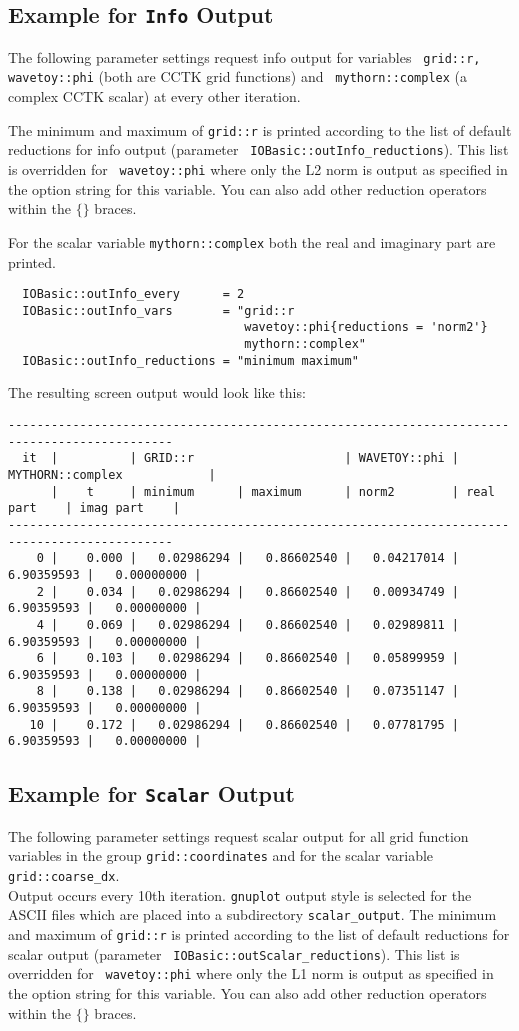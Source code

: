 \documentclass{article}
\begin{document}
\subsection {Example for {\tt Info} Output}
%
The following parameter settings request info output for variables {\tt
grid::r, wavetoy::phi} (both are CCTK grid functions) and {\tt
mythorn::complex}
(a complex CCTK scalar) at every other iteration.

The minimum and maximum of {\tt grid::r} is printed according to the list
of default reductions for info output (parameter {\tt
IOBasic::outInfo\_reductions}). This list is overridden for {\tt
wavetoy::phi} where only the L2 norm
is output as specified in the option string for this variable. You can also
add other reduction operators within the $\{\}$ braces.

For the scalar variable {\tt mythorn::complex} both the real and
imaginary part are printed.
\begin{verbatim}
  IOBasic::outInfo_every      = 2
  IOBasic::outInfo_vars       = "grid::r
                                 wavetoy::phi{reductions = 'norm2'}
                                 mythorn::complex"
  IOBasic::outInfo_reductions = "minimum maximum"
\end{verbatim}
The resulting screen output would look like this:
\begin{verbatim}
---------------------------------------------------------------------------------------------
  it  |          | GRID::r                     | WAVETOY::phi | MYTHORN::complex            |
      |    t     | minimum      | maximum      | norm2        | real part    | imag part    |
---------------------------------------------------------------------------------------------
    0 |    0.000 |   0.02986294 |   0.86602540 |   0.04217014 |   6.90359593 |   0.00000000 |
    2 |    0.034 |   0.02986294 |   0.86602540 |   0.00934749 |   6.90359593 |   0.00000000 |
    4 |    0.069 |   0.02986294 |   0.86602540 |   0.02989811 |   6.90359593 |   0.00000000 |
    6 |    0.103 |   0.02986294 |   0.86602540 |   0.05899959 |   6.90359593 |   0.00000000 |
    8 |    0.138 |   0.02986294 |   0.86602540 |   0.07351147 |   6.90359593 |   0.00000000 |
   10 |    0.172 |   0.02986294 |   0.86602540 |   0.07781795 |   6.90359593 |   0.00000000 |
\end{verbatim}
%
\subsection {Example for {\tt Scalar} Output}
%
The following parameter settings request scalar output for all grid function
variables in the group {\tt grid::coordinates} and for the scalar variable
{\tt grid::coarse\_dx}.\\
Output occurs every 10th iteration. {\tt gnuplot} output style is selected
for the ASCII files which are placed into a subdirectory {\tt scalar\_output}.
The minimum and maximum of {\tt grid::r} is printed according to the list
of default reductions for scalar output (parameter {\tt
IOBasic::outScalar\_reductions}). This list is overridden for {\tt
wavetoy::phi} where only the L1 norm
is output as specified in the option string for this variable. You can also
add other reduction operators within the $\{\}$ braces.
\end{document}
